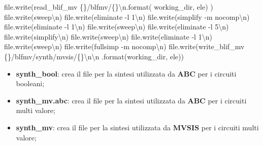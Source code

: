 \documentclass[
  italian,
]{book}
\newenvironment{Shaded}{\begin{snugshade}}{\end{snugshade}}
\newcommand{\BuiltInTok}[1]{#1}
\newcommand{\CharTok}[1]{\textcolor[rgb]{0.31,0.60,0.02}{#1}}
\newcommand{\NormalTok}[1]{#1}
\newcommand{\SpecialCharTok}[1]{\textcolor[rgb]{0.00,0.00,0.00}{#1}}
\newcommand{\StringTok}[1]{\textcolor[rgb]{0.31,0.60,0.02}{#1}}
\providecommand{\tightlist}{%
  \setlength{\itemsep}{0pt}\setlength{\parskip}{0pt}}
\begin{document}
\begin{Shaded}
\begin{Highlighting}[]
        \BuiltInTok{file}\NormalTok{.write(}\StringTok{\textquotesingle{}read\_blif\_mv }\SpecialCharTok{\{\}}\StringTok{/blfmv/}\SpecialCharTok{\{\}}\CharTok{\textbackslash{}n}\StringTok{\textquotesingle{}}\NormalTok{.}\BuiltInTok{format}\NormalTok{(}
\NormalTok{          working\_dir, ele)}
\NormalTok{        )}
        \BuiltInTok{file}\NormalTok{.write(}\StringTok{\textquotesingle{}sweep}\CharTok{\textbackslash{}n}\StringTok{\textquotesingle{}}\NormalTok{)}
        \BuiltInTok{file}\NormalTok{.write(}\StringTok{\textquotesingle{}eliminate {-}l 1}\CharTok{\textbackslash{}n}\StringTok{\textquotesingle{}}\NormalTok{)}
        \BuiltInTok{file}\NormalTok{.write(}\StringTok{\textquotesingle{}simplify {-}m nocomp}\CharTok{\textbackslash{}n}\StringTok{\textquotesingle{}}\NormalTok{)}
        \BuiltInTok{file}\NormalTok{.write(}\StringTok{\textquotesingle{}eliminate {-}l 1}\CharTok{\textbackslash{}n}\StringTok{\textquotesingle{}}\NormalTok{)}
        \BuiltInTok{file}\NormalTok{.write(}\StringTok{\textquotesingle{}sweep}\CharTok{\textbackslash{}n}\StringTok{\textquotesingle{}}\NormalTok{)}
        \BuiltInTok{file}\NormalTok{.write(}\StringTok{\textquotesingle{}eliminate {-}l 5}\CharTok{\textbackslash{}n}\StringTok{\textquotesingle{}}\NormalTok{)}
        \BuiltInTok{file}\NormalTok{.write(}\StringTok{\textquotesingle{}simplify}\CharTok{\textbackslash{}n}\StringTok{\textquotesingle{}}\NormalTok{)}
        \BuiltInTok{file}\NormalTok{.write(}\StringTok{\textquotesingle{}sweep}\CharTok{\textbackslash{}n}\StringTok{\textquotesingle{}}\NormalTok{)}
        \BuiltInTok{file}\NormalTok{.write(}\StringTok{\textquotesingle{}eliminate {-}l 1}\CharTok{\textbackslash{}n}\StringTok{\textquotesingle{}}\NormalTok{)}
        \BuiltInTok{file}\NormalTok{.write(}\StringTok{\textquotesingle{}sweep}\CharTok{\textbackslash{}n}\StringTok{\textquotesingle{}}\NormalTok{)}
        \BuiltInTok{file}\NormalTok{.write(}\StringTok{\textquotesingle{}fullsimp {-}m nocomp}\CharTok{\textbackslash{}n}\StringTok{\textquotesingle{}}\NormalTok{)}
        \BuiltInTok{file}\NormalTok{.write(}\StringTok{\textquotesingle{}write\_blif\_mv }\SpecialCharTok{\{\}}\StringTok{/blfmv/synth/mvsis/}\SpecialCharTok{\{\}}\CharTok{\textbackslash{}n\textbackslash{}n}\StringTok{\textquotesingle{}}
\NormalTok{          .}\BuiltInTok{format}\NormalTok{(working\_dir, ele))}
\end{Highlighting}
\end{Shaded}

\begin{itemize}
\tightlist
\item
  \textbf{synth\_bool}: crea il file per la sintesi utilizzata da \textbf{ABC} per i circuiti booleani;
\item
  \textbf{synth\_mv.abc}: crea il file per la sintesi utilizzata da \textbf{ABC} per i circuiti multi valore;
\item
  \textbf{synth\_mv}: crea il file per la sintesi utilizzata da \textbf{MVSIS} per i circuiti multi valore;
\end{itemize}
\end{document}
